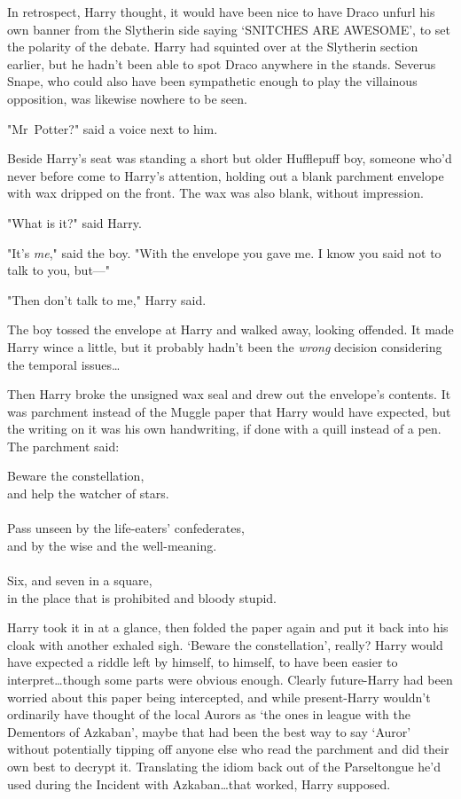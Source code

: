 In retrospect, Harry thought, it would have been nice to have Draco unfurl his
own banner from the Slytherin side saying `SNITCHES ARE AWESOME', to set the
polarity of the debate. Harry had squinted over at the Slytherin section
earlier, but he hadn't been able to spot Draco anywhere in the stands. Severus
Snape, who could also have been sympathetic enough to play the villainous
opposition, was likewise nowhere to be seen.

"Mr~Potter?" said a voice next to him.

Beside Harry's seat was standing a short but older Hufflepuff boy, someone
who'd never before come to Harry's attention, holding out a blank parchment
envelope with wax dripped on the front. The wax was also blank, without
impression.

"What is it?" said Harry.

"It's \emph{me}," said the boy. "With the envelope you gave me. I know you said
not to talk to you, but—"

"Then don't talk to me," Harry said.

The boy tossed the envelope at Harry and walked away, looking offended. It made
Harry wince a little, but it probably hadn't been the \emph{wrong} decision
considering the temporal issues…

Then Harry broke the unsigned wax seal and drew out the envelope's contents. It
was parchment instead of the Muggle paper that Harry would have expected, but
the writing on it was his own handwriting, if done with a quill instead of a
pen. The parchment said:

\begin{writtenNote}
Beware the constellation,\\
and help the watcher of stars.\\
\\
Pass unseen by the life-eaters' confederates,\\
and by the wise and the well-meaning.\\
\\
Six, and seven in a square,\\
in the place that is prohibited and bloody stupid.
\end{writtenNote}

Harry took it in at a glance, then folded the paper again and put it back into
his cloak with another exhaled sigh. `Beware the constellation', really? Harry
would have expected a riddle left by himself, to himself, to have been easier
to interpret…though some parts were obvious enough. Clearly
future-Harry had been worried about this paper being intercepted, and while
present-Harry wouldn't ordinarily have thought of the local Aurors as `the ones
in league with the Dementors of Azkaban', maybe that had been the best way to
say `Auror' without potentially tipping off anyone else who read the parchment
and did their own best to decrypt it. Translating the idiom back out of the
Parseltongue he'd used during the Incident with Azkaban…that worked,
Harry supposed.

